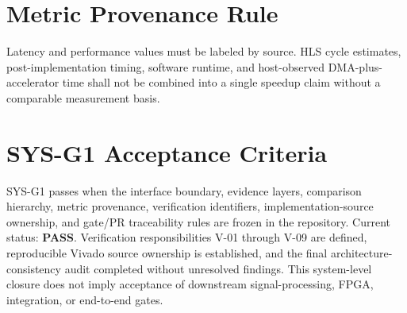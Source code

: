 \section{Metric Provenance Rule}
Latency and performance values must be labeled by source. HLS cycle estimates,
post-implementation timing, software runtime, and host-observed DMA-plus-accelerator time
shall not be combined into a single speedup claim without a comparable measurement basis.

\section{SYS-G1 Acceptance Criteria}
SYS-G1 passes when the interface boundary, evidence layers, comparison hierarchy, metric
provenance, verification identifiers, implementation-source ownership, and gate/PR
traceability rules are frozen in the repository. Current status: \textbf{PASS}.
Verification responsibilities V-01 through V-09 are defined, reproducible Vivado source
ownership is established, and the final architecture-consistency audit completed without
unresolved findings. This system-level closure does not imply acceptance of downstream
signal-processing, FPGA, integration, or end-to-end gates.
